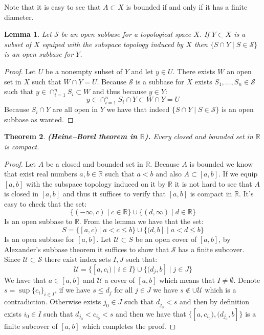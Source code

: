 \documentclass[11pt,a4paper]{article}
\theoremstyle{definition}
\theoremstyle{plain}
\newtheorem{theorem}{Theorem}[section]
\newtheorem{lemma}[theorem]{Lemma}
\newcommand{\R}{\mathbb{R}}
\renewcommand{\tt}[1]{\textnormal{\textbf{(#1).}}} %
\begin{document}
  Note that it is easy to see that $A \subset X$ is bounded if and only
  if it has a finite diameter.
  
  \begin{lemma}
    Let $\mathcal{S}$ be an open subbase for a topological space $X$.
    If $Y \subset X$ is a subset of $X$ equiped with the subspace
    topology induced by $X$ then $\{S \cap Y \mid S \in \mathcal{S}\}$
    is an open subbase for $Y$.
  \end{lemma}
  \begin{proof}
    Let $U$ be a nonempty subset of $Y$ and let $y \in U$. There
    exists $W$ an open set in $X$ such that $W \cap Y = U$. Because
    $\mathcal{S}$ is a subbase for $X$ exists 
    $S_1,\dots,S_n \in \mathcal{S}$ such that 
    $y \in \cap_{i=1}^{n}{S_i} \subset W$ and thus because $y \in Y$:
    \[
      y \in \cap_{i=1}^{n}{S_i \cap Y} \subset W \cap Y = U
    \]
    Because $S_i \cap Y$ are all open in $Y$ we have that indeed
    $\{S \cap Y \mid S \in \mathcal{S}\}$ is an open subbase as wanted.
  \end{proof}

  \begin{theorem}
    \tt{Heine–Borel theorem in $\R$}
    Every closed and bounded set in $\R$ is compact.
  \end{theorem}
  \begin{proof}
    Let $A$ be a closed and bounded set in $\R$. Because $A$ is bounded
    we know that exist real numbers $a,b \in \R$ such that $a < b$ and
    also $A \subset [a,b]$. If we equip $[a,b]$ with the subspace
    topology induced on it by $\R$ it is not hard to see that $A$ is
    closed in $[a,b]$ and thus it suffices to verify that $[a,b]$
    is compact in $\R$. It's easy to check that the set:
    \[
      \{(-\infty, c) \mid c \in \R\} \cup 
      \{(d, \infty) \mid d \in \R\}
    \]
    Is an open subbase to $\R$. From the lemma we have that the set:
    \[
      S = \{[a, c) \mid a < c \le b\} \cup 
      \{(d, b] \mid a < d \le b\}
    \]
    Is an open subbase for $[a,b]$. Let $\mathcal{U} \subset S$ be an
    open cover of $[a,b]$, by Alexander's subbase theorem it suffices
    to show that $\mathcal{S}$ has a finite subcover. Since 
    $\mathcal{U} \subset \mathcal{S}$ there exist index sets $I,J$ such 
    that:
    \[
      \mathcal{U} = 
      \{[a,c_i) \mid i \in I\} \cup \{(d_j,b] \mid j \in J\}
    \]
    We have that $a \in [a,b]$ and $\mathcal{U}$ a cover of $[a,b]$
    which means that $I \neq \emptyset$. 
    Denote $s = \sup\{c_i\}_{i\in I}$,  if we have $s \le d_j$ for
    all $j \in J$ we have $s \notin \cup\mathcal{U}$ which is a 
    contradiction. Otherwise exists $j_0 \in J$ such that 
    $d_{j_0} < s$ and then by definition exists $i_0 \in I$ such that
    $d_{j_0} < c_{i_0} < s$ and then we have that 
    $\{[a,c_{i_0}), (d_{j_0},b]\}$ is a finite subcover of $[a,b]$ which
    completes the proof.
  \end{proof}
\end{document}

